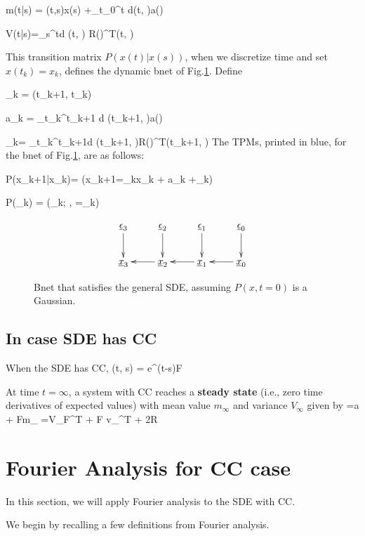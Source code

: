 \beq
m(t|s) =
\Psi(t,s)x(s)
+\int_{t_0}^t d\tau \Psi(t, \tau)a(\tau)
\eeq

\beq
V(t|s)=\int_s^td\tau\;
\Psi(t, \tau)
R(\tau)\Psi^T(t, \tau)
\eeq

This transition matrix $P(x(t)|x(s))$, when we discretize time and set $x(t_k)=x_k$, defines the
dynamic bnet of Fig.\ref{fig-1st-2nd-order-bnet}.
Define

\beq
\Psi_k = \Psi(t_{k+1}, t_k)
\eeq

\beq
a_k = \int_{t_k}^{t_{k+1}}
d\tau\; \Psi(t_{k+1}, \tau)a(\tau)
\eeq

\beq
\Sigma_k=
\int_{t_k}^{t_{k+1}}d\tau\;
\Psi(t_{k+1}, \tau)R(\tau)\Psi^T(t_{k+1}, \tau)
\eeq
The TPMs,
printed in blue, for the bnet of Fig.\ref{fig-1st-2nd-order-bnet}, are as follows:

\beq \color{blue}
P(x_{k+1}|x_k)= \indi(x_{k+1}=\Psi_kx_k + a_k +\eps_k)
\eeq

\beq \color{blue}
P(\eps_k) = \caln(\eps_k; , \Sigma=\Sigma_k)
\eeq




\begin{figure}[h!]
$$
\xymatrix{
\ul{\eps}_3 \ar[d]
& \ul{\eps}_2 \ar[d]
& \ul{\eps}_1 \ar[d]
& \ul{\eps}_0\ar[d]
\\
\rvx_3
& \rvx _2 \ar[l]
& \rvx_1 \ar[l]
& \rvx_0\ar[l]
}
$$
\caption{Bnet that satisfies the general SDE,
assuming $P(x,t=0)$ is a Gaussian.}
\label{fig-1st-2nd-order-bnet}
\end{figure}





\subsection{In case SDE has CC}
When the SDE has CC,
\beq
\Psi(t, s) = e^{(t-s)F}
\eeq


At time $t=\infty$,
a system with CC reaches
a {\bf steady state} (i.e., zero time derivatives of expected values)
with mean value $m_\infty$
and variance $V_\infty$ given by
=a + Fm_\infty
\eeq
{}=V_\infty F^T  + F v_\infty^T + 2R
\eeq


\section{Fourier Analysis for CC case}

In this section, we will apply Fourier
analysis to the SDE with CC.

We begin by recalling a few definitions from Fourier
analysis.

